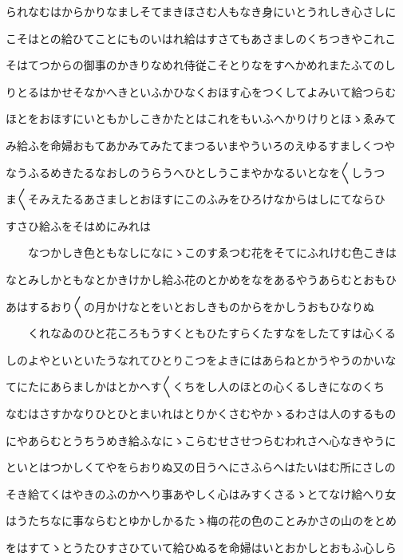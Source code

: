 \documentclass[a4paper,11pt,landscape]{ltjtarticle}
\begin{document}
\par\medskip
られなむはからかりなましそてまきほさむ人もなき身にいとうれしき心さしに
\par\medskip
こそはとの給ひてことにものいはれ給はすさてもあさましのくちつきやこれこ
\par\medskip
そはてつからの御事のかきりなめれ侍従こそとりなをすへかめれまたふてのし
\par\medskip
りとるはかせそなかへきといふかひなくおほす心をつくしてよみいて給つらむ
\par\medskip
ほとをおほすにいともかしこきかたとはこれをもいふへかりけりとほゝゑみて
\par\medskip
み給ふを命婦おもてあかみてみたてまつるいまやういろのえゆるすましくつや
\par\medskip
なうふるめきたるなおしのうらうへひとしうこまやかなるいとなを〱しうつ
\par\medskip
ま〱そみえたるあさましとおほすにこのふみをひろけなからはしにてならひ
\par\medskip
すさひ給ふをそはめにみれは
\par\medskip
　　なつかしき色ともなしになにゝこのすゑつむ花をそてにふれけむ色こきは
\par\medskip
なとみしかともなとかきけかし給ふ花のとかめをなをあるやうあらむとおもひ
\par\medskip
あはするおり〱の月かけなとをいとおしきものからをかしうおもひなりぬ
\par\medskip
　　くれなゐのひと花ころもうすくともひたすらくたすなをしたてすは心くる
\par\medskip
しのよやといといたうなれてひとりこつをよきにはあらねとかうやうのかいな
\par\medskip
てにたにあらましかはとかへす〱くちをし人のほとの心くるしきになのくち
\par\medskip
なむはさすかなりひとひとまいれはとりかくさむやかゝるわさは人のするもの
\par\medskip
にやあらむとうちうめき給ふなにゝこらむせさせつらむわれさへ心なきやうに
\par\medskip
といとはつかしくてやをらおりぬ又の日うへにさふらへはたいはむ所にさしの
\par\medskip
そき給てくはやきのふのかへり事あやしく心はみすくさるゝとてなけ給へり女
\par\medskip
はうたちなに事ならむとゆかしかるたゝ梅の花の色のことみかさの山のをとめ
\par\medskip
をはすてゝとうたひすさひていて給ひぬるを命婦はいとおかしとおもふ心しら
\par\medskip
\end{document}
